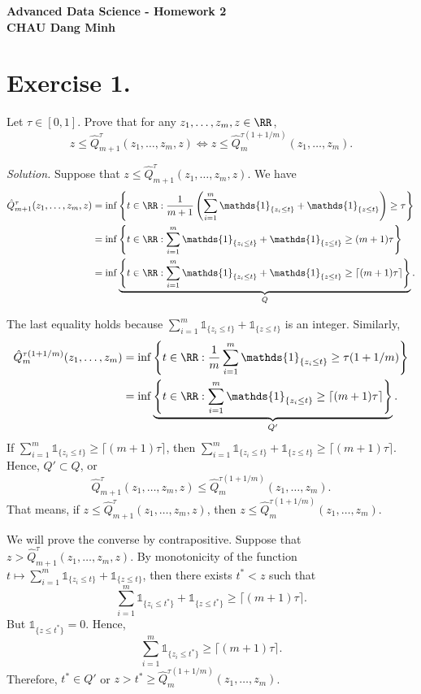 \begin{center}
  \bf
  \vspace{0.9cm}
  Advanced Data Science - Homework 2\\
  \vspace{0.2cm}
  CHAU Dang Minh
\end{center}

\section{Exercise 1.} Let $\tau\in[0,1]$. Prove that for any $z_1,\ldots,z_m,z\in\RR$,
$$z\le \hat{Q}^{\tau}_{m+1}(z_1,\ldots,z_m,z)\Longleftrightarrow z\le \hat{Q}^{\tau(1+1/m)}_m(z_1,\ldots,z_m).$$

\textit{Solution.} Suppose that $ z\le \hat{Q}^{\tau}_{m+1}(z_1,\ldots,z_m,z)$. We have
\begin{align*}
  \hat{Q}^{\tau}_{m+1}(z_1,\ldots,z_m,z)
   & = \inf\left\{t\in \RR: \dfrac{1}{m+1} \left(\sum_{i=1}^{m}\mathds{1}_{\{z_i\le t\}} + \mathds{1}_{\{z\le t\}}\right) \ge \tau\right\}         \\
   & =\inf\left\{t\in \RR:  \sum_{i=1}^{m}\mathds{1}_{\{z_i\le t\}} + \mathds{1}_{\{z\le t\}} \ge (m+1)\tau\right\}                                \\
   & = \inf\underbrace{\left\{t\in \RR: \sum_{i=1}^{m} \mathds{1}_{\{z_i\le t\}} + \mathds{1}_{\{z\le t\}} \ge \lceil(m+1)\tau\rceil\right\}}_{Q}.
\end{align*}

The last equality holds because $\sum_{i=1}^{m} \mathds{1}_{\{z_i\le t\}} + \mathds{1}_{\{z\le t\}}$ is an integer. Similarly,
\begin{align*}
  \hat{Q}^{\tau(1+1/m)}_m(z_1,\ldots,z_m)
   & = \inf\left\{t\in \RR: \dfrac{1}{m} \sum_{i=1}^{m} \mathds{1}_{\{z_i\le t\}} \ge \tau(1+1/m)\right\}                 \\
   & = \inf\underbrace{\left\{t\in \RR: \sum_{i=1}^{m} \mathds{1}_{\{z_i\le t\}} \ge \lceil(m+1)\tau\rceil\right\}}_{Q'}.
\end{align*}
If $\sum_{i=1}^{m} \mathds{1}_{\{z_i\le t\}} \ge \lceil(m+1)\tau\rceil$, then $\sum_{i=1}^{m} \mathds{1}_{\{z_i\le t\}} + \mathds{1}_{\{z\le t\}} \ge \lceil(m+1)\tau\rceil$. Hence, $Q'\subset Q$, or
$$\hat{Q}^{\tau}_{m+1}(z_1,\ldots,z_m,z)\le \hat{Q}^{\tau(1+1/m)}_m(z_1,\ldots,z_m).$$
That means, if $z\le \hat{Q}^{\tau}_{m+1}(z_1,\ldots,z_m,z)$, then $z\le \hat{Q}^{\tau(1+1/m)}_m(z_1,\ldots,z_m)$.

We will prove the converse by contrapositive. Suppose that $z > \hat{Q}^{\tau}_{m+1}(z_1,\ldots,z_m,z)$. By monotonicity of the function $t\mapsto \sum_{i=1}^{m} \mathds{1}_{\{z_i\le t\}} + \mathds{1}_{\{z\le t\}}$, then there exists $t^*<z$ such that
$$\sum_{i=1}^{m} \mathds{1}_{\{z_i\le t^*\}} + \mathds{1}_{\{z\le t^*\}} \ge \lceil(m+1)\tau\rceil.$$
But $\mathds{1}_{\{z\le t^*\}} = 0$. Hence,
$$\sum_{i=1}^{m} \mathds{1}_{\{z_i\le t^*\}} \ge \lceil(m+1)\tau\rceil.$$
Therefore, $t^*\in Q'$ or $z> t^*\ge \hat{Q}^{\tau(1+1/m)}_m(z_1,\ldots,z_m)$.

